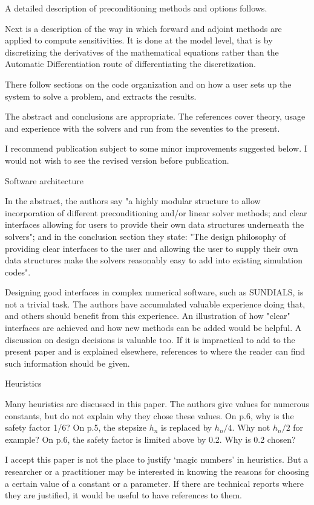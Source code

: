 A detailed description of preconditioning methods and options follows. 

Next is a description of the way in which forward and adjoint methods
are applied to compute sensitivities. It is done at the model level,
that is by discretizing the derivatives of the mathematical equations
rather than the Automatic Differentiation route of differentiating the
discretization.

There follow sections on the code organization and on how a user sets
up the system to solve a problem, and extracts the results. 

The abstract and conclusions are appropriate. The references cover
theory, usage and experience with the solvers and run from the
seventies to the present.  

I recommend publication subject to some minor improvements suggested
below.  I would not wish to see the revised version before publication.


Software architecture 

In the abstract, the authors say "a highly modular structure to allow
incorporation of different preconditioning and/or linear solver
methods; and clear interfaces allowing for users to provide their own
data structures underneath the solvers"; and in the conclusion section
they state: "The design philosophy of providing clear interfaces to
the user and allowing the user to supply their own data structures
make the solvers reasonably easy to add into existing simulation
codes".

Designing good interfaces in complex numerical software, such as
SUNDIALS, is not a trivial task. The authors have accumulated valuable
experience doing that, and others should benefit from this
experience. An illustration of how "clear" interfaces are achieved and
how new methods can be added would be helpful.  A discussion on design
decisions is valuable too. If it is impractical to add to the present
paper and is explained elsewhere, references to where the reader can
find such information should be given.


Heuristics 

Many heuristics are discussed in this paper. The authors give values
for numerous constants, but do not explain why they chose these
values.  On p.6, why is the safety factor 1/6? On p.5, the stepsize
$h_n$ is replaced by $h_n/4$. Why not $h_n/2$ for example? On p.6, the
safety factor is limited above by 0.2. Why is 0.2 chosen? 

I accept this paper is not the place to justify `magic numbers' in
heuristics. But a researcher or a practitioner may be interested in
knowing the reasons for choosing a certain value of a constant or a
parameter. If there are technical reports where they are justified, it
would be useful to have references to them. 

